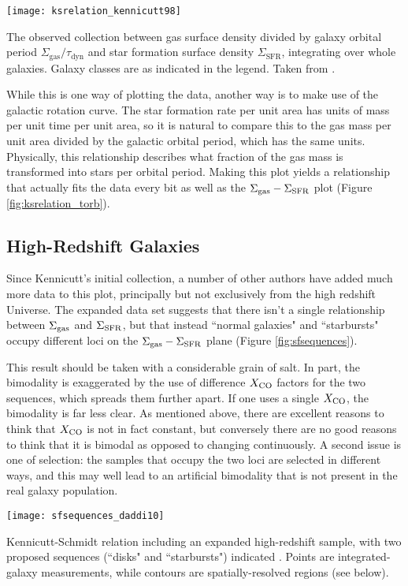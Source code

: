 \begin{marginfigure}
\texttt{[image: ksrelation\_kennicutt98]}
\caption[Whole-galaxy Kennicutt-Schmidt relation, including orbital time]{
\label{fig:ksrelation_torb}
The observed collection between gas surface density divided by galaxy orbital period $\Sigma_{\mathrm{gas}}/\tau_{\mathrm{dyn}}$ and star formation surface density $\Sigma_{\mathrm{SFR}}$, integrating over whole galaxies. Galaxy classes are as indicated in the legend. Taken from \citet{kennicutt98a}.
}
\end{marginfigure}

While this is one way of plotting the data, another way is to make use of the galactic rotation curve. The star formation rate per unit area has units of mass per unit time per unit area, so it is natural to compare this to the gas mass per unit area divided by the galactic orbital period, which has the same units. Physically, this relationship describes what fraction of the gas mass is transformed into stars per orbital period. Making this plot yields a relationship that actually fits the data every bit as well as the $\Sigma_{\rm gas} - \Sigma_{\rm SFR}$ plot (Figure \ref{fig:ksrelation_torb}).

\subsection{High-Redshift Galaxies}

Since Kennicutt's initial collection, a number of other authors have added much more data to this plot, principally but not exclusively from the high redshift Universe. The expanded data set suggests that there isn't a single relationship between $\Sigma_{\rm gas}$ and $\Sigma_{\rm SFR}$, but that instead ``normal galaxies" and ``starbursts" occupy different loci on the $\Sigma_{\rm gas} - \Sigma_{\rm SFR}$ plane (Figure \ref{fig:sfsequences}).

This result should be taken with a considerable grain of salt. In part, the bimodality is exaggerated by the use of difference $X_{\rm CO}$ factors for the two sequences, which spreads them further apart. If one uses a single $X_{\rm CO}$, the bimodality is far less clear. As mentioned above, there are excellent reasons to think that $X_{\rm CO}$ is not in fact constant, but conversely there are no good reasons to think that it is bimodal as opposed to changing continuously. A second issue is one of selection: the samples that occupy the two loci are selected in different ways, and this may well lead to an artificial bimodality that is not present in the real galaxy population.
\begin{marginfigure}
\texttt{[image: sfsequences\_daddi10]}
\caption[Kennicutt-Schmidt relation, with additional high-redshift data]{
\label{fig:sfsequences}
Kennicutt-Schmidt relation including an expanded high-redshift sample, with two proposed sequences (``disks" and ``starbursts") indicated \citet{daddi10a}. Points are integrated-galaxy measurements, while contours are spatially-resolved regions (see below).
}
\end{marginfigure}

